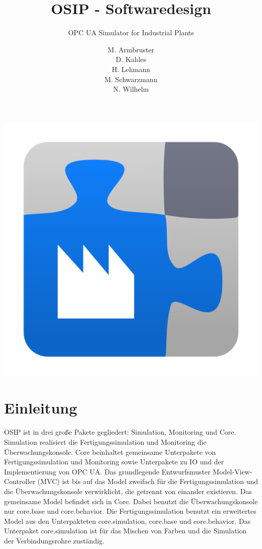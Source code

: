 \documentclass[parskip=full]{scrartcl}
\title{OSIP - Softwaredesign}
\subtitle{OPC UA Simulator for Industrial Plants}
\author{
    M. Armbruster\\
    D. Kahles\\
    H. Lehmann\\
    M. Schwarzmann\\
    N. Wilhelm
}
\begin{document}
\maketitle

\vspace{20px}
\begin{center}
  \includegraphics[scale=0.4]{../icon.png}
\end{center}
\pagebreak
\tableofcontents
\pagebreak

\section{Einleitung}
OSIP ist in drei große Pakete gegliedert: Simulation, Monitoring und Core.
Simulation realisiert die Fertigungssimulation und Monitoring die Überwachungskonsole.
Core beinhaltet gemeinsame Unterpakete von Fertigungssimulation und Monitoring sowie Unterpakete zu IO und der Implementierung
von OPC UA.
Das grundlegende Entwurfsmuster Model-View-Controller (MVC) ist bis auf das Model zweifach für die Fertigungssimulation und die Überwachungskonsole verwirklicht, die getrennt von einander existieren.
Das gemeinsame Model befindet sich in Core. Dabei benutzt die Überwachungskonsole nur core.base und core.behavior.
Die Fertigungssimulation benutzt ein erweitertes Model aus den Unterpakteten core.simulation, core.base und core.behavior.
Das Unterpaket core.simulation ist für das Mischen von Farben und die Simulation der Verbindungsrohre zuständig.
\end{document}

